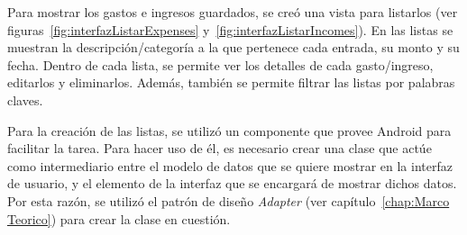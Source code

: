 Para mostrar los gastos e ingresos guardados, se creó una vista para listarlos (ver figuras~\ref{fig:interfazListarExpenses} y~\ref{fig:interfazListarIncomes}). En las listas se muestran la descripción/categoría a la que pertenece cada entrada, su monto y su fecha. Dentro de cada lista, se permite ver los detalles de cada gasto/ingreso, editarlos y eliminarlos. Además, también se permite filtrar las listas por palabras claves. 

Para la creación de las listas, se utilizó un componente que provee Android para facilitar la tarea. Para hacer uso de él, es necesario crear una clase que actúe como intermediario entre el modelo de datos que se quiere mostrar en la interfaz de usuario, y el elemento de la interfaz que se encargará de mostrar dichos datos. Por esta razón, se utilizó el patrón de diseño \textit{Adapter} (ver capítulo~\ref{chap:Marco Teorico}) para crear la clase en cuestión.

